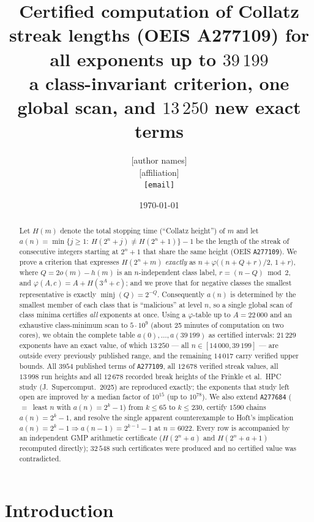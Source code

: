 \documentclass[11pt]{article}
\title{Certified computation of Collatz streak lengths (OEIS A277109) for all exponents up to $39\,199$\\[4pt]
\large a class-invariant criterion, one global scan, and $13\,250$ new exact terms}
\author{[author names]\\ \small [affiliation]\\ \small \texttt{[email]}}
\date{\today}
\theoremstyle{remark}
\newcommand{\ooo}{o}
\newcommand{\hh}{h}
\begin{document}
\maketitle

\begin{abstract}
Let $H(m)$ denote the total stopping time (``Collatz height'') of $m$ and let
$a(n)=\min\{j\ge 1:\ H(2^n+j)\ne H(2^n+1)\}-1$ be the length of the streak of consecutive integers
starting at $2^n+1$ that share the same height (OEIS \texttt{A277109}).
We prove a criterion that expresses $H(2^n+m)$ \emph{exactly} as
$n+\varphi\!\big((n+Q+r)/2,\,1+r\big)$, where $Q=2\ooo(m)-\hh(m)$ is an $n$-independent class label,
$r=(n-Q)\bmod 2$, and $\varphi(A,c)=A+H(3^A+c)$; and we prove that for negative classes the smallest
representative is exactly $\operatorname{minj}(Q)=2^{-Q}$.
Consequently $a(n)$ is determined by the smallest member of each class that is ``malicious'' at level $n$,
so a single global scan of class minima certifies \emph{all} exponents at once.
Using a $\varphi$-table up to $A=22\,000$ and an exhaustive class-minimum scan to $5\cdot10^9$
(about 25 minutes of computation on two cores), we obtain the complete table
$a(0),\dots,a(39\,199)$ as certified intervals:
$21\,229$ exponents have an exact value, of which $13\,250$ --- all $n\in[14\,000,39\,199]$ --- are
outside every previously published range, and the remaining $14\,017$ carry verified upper bounds.
All $3954$ published terms of \texttt{A277109}, all $12\,678$ verified streak values, all $13\,998$ run
heights and all $12\,678$ recorded break heights of the Frinkle et al.\ HPC study
(J.\ Supercomput.\ 2025) are reproduced exactly;
the exponents that study left open are improved by a median factor of $10^{15}$ (up to $10^{78}$).
We also extend \texttt{A277684} ($=$\ least $n$ with $a(n)=2^k-1$) from $k\le65$ to $k\le230$,
certify $1590$ chains $a(n)=2^k-1$, and resolve the single apparent counterexample to Hoft's
implication $a(n)=2^k-1\Rightarrow a(n-1)=2^{k-1}-1$ at $n=6022$.
Every row is accompanied by an independent GMP arithmetic certificate
($H(2^n+a)$ and $H(2^n+a+1)$ recomputed directly); $32\,548$ such certificates were produced and
no certified value was contradicted.
\end{abstract}

\section{Introduction}\label{sec:intro}
\end{document}
